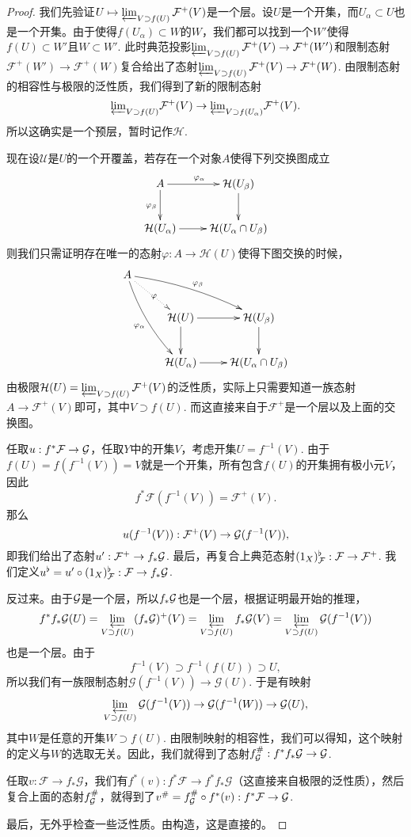 \begin{proof}
	我们先验证$U\mapsto \varprojlim_{V\supset f(U)} \mathcal{F}^+(V)$是一个层。设$U$是一个开集，而$U_\alpha\subset U$也是一个开集。由于使得$f(U_\alpha)\subset W$的$W$，我们都可以找到一个$W'$使得$f(U)\subset W'$且$W\subset W'$. 此时典范投影$\varprojlim_{V\supset f(U)} \mathcal{F}^+(V)\to \mathcal{F}^+(W')$和限制态射$\mathcal{F}^+(W')\to \mathcal{F}^+(W)$复合给出了态射$\varprojlim_{V\supset f(U)} \mathcal{F}^+(V)\to \mathcal{F}^+(W)$. 由限制态射的相容性与极限的泛性质，我们得到了新的限制态射
	\[
	{\varprojlim}_{V\supset f(U)} \mathcal{F}^+(V)\to {\varprojlim}_{V\supset f(U_\alpha)} \mathcal{F}^+(V).
	\]
	所以这确实是一个预层，暂时记作$\mathcal{H}$.

	现在设$\mathscr{U}$是$U$的一个开覆盖，若存在一个对象$A$使得下列交换图成立
	\[
	\xymatrix{
		A\ar[r]^{\varphi_{\alpha}}\ar[d]_{\varphi_{\beta}}&\mathcal{H}(U_\beta)\ar[d]\\
		\mathcal{H}(U_\alpha)\ar[r]&\mathcal{H}(U_{\alpha}\cap U_{\beta})
	}
	\]
	则我们只需证明存在唯一的态射$\varphi:A\to \mathcal{H}(U)$使得下图交换的时候，
	\[
		\xymatrix{
			A\ar@/_/[ddr]_{\varphi_{\alpha}}\ar@/^/[drr]^{\varphi_{\beta}}\ar@{.>}[dr]|{\varphi}&& \\
			&\mathcal{H}(U)\ar[r]\ar[d]&\mathcal{H}(U_\beta)\ar[d]\\
			&\mathcal{H}(U_\alpha)\ar[r]&\mathcal{H}(U_{\alpha}\cap U_{\beta})
		}
	\]
	由极限$\mathcal{H}(U)=\varprojlim_{V\supset f(U)} \mathcal{F}^+(V)$的泛性质，实际上只需要知道一族态射$A\to \mathcal{F}^+(V)$即可，其中$V\supset f(U)$. 而这直接来自于$\mathcal{F}^+$是一个层以及上面的交换图。

	任取$u:f^*\mathcal{F}\to\mathcal{G}$，任取$Y$中的开集$V$，考虑开集$U=f^{-1}(V)$. 由于$f(U)=f(f^{-1}(V))=V$就是一个开集，所有包含$f(U)$的开集拥有极小元$V$，因此
	\[
	f^*\mathcal{F}(f^{-1}(V))=\mathcal{F}^+(V).
	\]
	那么
	\[
	u(f^{-1}(V)):\mathcal{F}^+(V)\to \mathcal{G}(f^{-1}(V)),
	\]
	即我们给出了态射$u':\mathcal{F}^+\to f_*\mathcal{G}$. 最后，再复合上典范态射$(1_X)^\flat_{\mathcal{F}}:\mathcal{F} \to \mathcal{F}^+$. 我们定义$u^\flat=u'\circ (1_X)^\flat_{\mathcal{F}}: \mathcal{F}\to f_*\mathcal{G}$.

	反过来。由于$\mathcal{G}$是一个层，所以$f_*\mathcal{G}$也是一个层，根据证明最开始的推理，
	\[
		f^*f_*\mathcal{G}(U)=\varprojlim_{V\supset f(U)} (f_*\mathcal{G})^+(V)=\varprojlim_{V\supset f(U)} f_*\mathcal{G}(V)=\varprojlim_{V\supset f(U)} \mathcal{G}(f^{-1}(V))
	\]
	也是一个层。由于
	\[
	f^{-1}(V)\supset f^{-1}(f(U))\supset U,
	\]
	所以我们有一族限制态射$\mathcal{G}(f^{-1}(V))\to \mathcal{G}(U)$. 于是有映射
	\[
	\varprojlim_{V\supset f(U)} \mathcal{G}(f^{-1}(V))\to \mathcal{G}(f^{-1}(W))\to \mathcal{G}(U),
	\]
	其中$W$是任意的开集$W\supset f(U)$. 由限制映射的相容性，我们可以得知，这个映射的定义与$W$的选取无关。因此，我们就得到了态射$f^\#_{\mathcal{G}}:f^*f_*\mathcal{G}\to \mathcal{G}$.

	任取$v:\mathcal{F}\to f_*\mathcal{G}$，我们有$f^*(v):f^*\mathcal{F}\to f^*f_*\mathcal{G}$（这直接来自极限的泛性质），然后复合上面的态射$f^\#_{\mathcal{G}}$，就得到了$v^\#=f^\#_{\mathcal{G}}\circ f^*(v):f^*\mathcal{F}\to \mathcal{G}$.

	最后，无外乎检查一些泛性质。由构造，这是直接的。
\end{proof}


